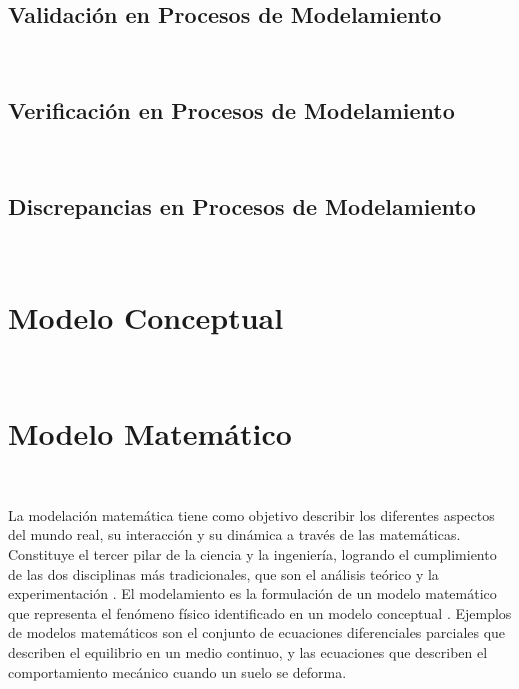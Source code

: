 \lipsum[3-4]

\bigskip


\subsection{Validación en Procesos de Modelamiento}~\hypertarget{sec:sec311}{}
\label{sec:sec311}


\subsection{Verificación en Procesos de Modelamiento}~\hypertarget{sec:sec312}{}
\label{sec:sec312}


\subsection{Discrepancias en Procesos de Modelamiento}~\hypertarget{sec:sec313}{}
\label{sec:sec313}


\section{Modelo Conceptual}~\hypertarget{sec:sec320}{}
\label{sec:sec320}
\newpage

\section{Modelo Matemático}~\hypertarget{sec:sec330}{}
\label{sec:sec330}

La modelación matemática tiene como objetivo describir los diferentes aspectos del mundo real, su interacción y su dinámica a través de las matemáticas. Constituye el tercer pilar de la ciencia y la ingeniería, logrando el cumplimiento de las dos disciplinas más tradicionales, que son el análisis teórico y la experimentación \cite{Quarteroni2009MathematicalEngineering}. El modelamiento es la formulación de un modelo matemático que representa el fenómeno físico identificado en un modelo conceptual \cite{R.B.J.2013ValidationAnalysis}. Ejemplos de modelos matemáticos son el conjunto de ecuaciones diferenciales parciales que describen el equilibrio en un medio continuo, y las ecuaciones que describen el comportamiento mecánico cuando un suelo se deforma.\bigskip

